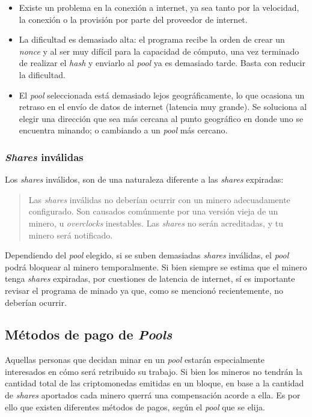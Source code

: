 \documentclass[12pt,a4paper,twoside]{book}
\begin{document}
\begin{itemize}
\item Existe un problema en la conexión a internet, ya sea tanto por la velocidad, la conexión o la provisión por parte del proveedor de internet.
\item La dificultad es demasiado alta: el programa recibe la orden de crear un \textit{nonce} y al ser muy difícil para la capacidad de cómputo, una vez terminado de realizar el \textit{hash} y enviarlo al \textit{pool} ya es demasiado tarde. Basta con reducir la dificultad.
\item El \textit{pool} seleccionada está demasiado lejos geográficamente, lo que ocasiona un retraso en el envío de datos de internet (latencia muy grande). Se soluciona al elegir una dirección que sea más cercana al punto geográfico en donde uno se encuentra minando; o cambiando a un \textit{pool} más cercano.
\end{itemize}

\subsubsection{\textit{Shares} inválidas}
Los \textit{shares} inválidos, son de una naturaleza diferente a las \textit{shares} expiradas:

\begin{quotation}
Las \textit{shares} inválidas no deberían ocurrir con un minero adecuadamente configurado. Son causados comúnmente por una versión vieja de un minero, u \textit{overclocks} inestables. Las \textit{shares} no serán acreditadas, y tu minero será notificado. \cite{shares:invalidas}
\end{quotation}

Dependiendo del \textit{pool} elegido, si se suben demasiadas \textit{shares} inválidas, el \textit{pool} podrá bloquear al minero temporalmente. Si bien siempre se estima que el minero tenga \textit{shares} expiradas, por cuestiones de latencia de internet, sí es importante revisar el programa de minado ya que, como se mencionó recientemente, no deberían ocurrir.

\subsection{Métodos de pago de \textit{Pools}}
Aquellas personas que decidan minar en un \textit{pool} estarán especialmente interesados en cómo será retribuido su trabajo. Si bien los mineros no tendrán la cantidad total de las criptomonedas emitidas en un bloque, en base a la cantidad de \textit{shares} aportados cada minero querrá una compensación acorde a ella. Es por ello que existen diferentes métodos de pagos, según el \textit{pool} que se elija.
\end{document}

